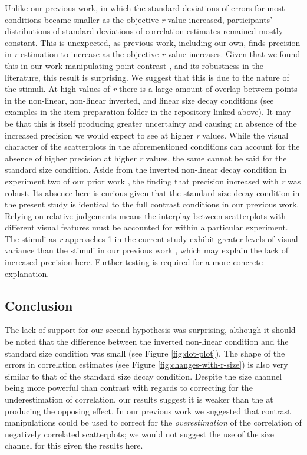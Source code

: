 \documentclass{vgtc}                          %
\begin{document}
Unlike our previous work, in which the standard deviations of errors for most
conditions became smaller as the objective \emph{r} value increased, participants'
distributions of standard deviations of correlation estimates remained mostly constant. This
is unexpected, as previous work, including our own, finds precision
in \emph{r} estimation to increase as the objective \emph{r} value increases. Given that we found
this in our work manipulating point contrast \cite{strain_2023}, and
its robustness in the literature, this result is surprising. We suggest that this
is due to the nature of the stimuli. At high values of \emph{r} there is a large amount
of overlap between points in the non-linear, non-linear inverted, and linear size decay conditions (see examples in the item preparation folder in the repository linked above). It may be that this
is itself producing greater uncertainty and causing an absence of the increased
precision we would expect to see at higher \emph{r} values. While the visual character
of the scatterplots in the aforementioned conditions can account for the absence
of higher precision at higher \emph{r} values, the same cannot be said for the standard size
condition. Aside from the inverted non-linear decay condition in experiment two of
our prior work \cite{strain_2023}, the finding that precision increased with \emph{r}
was robust. Its absence here is curious given that the standard size decay condition in
the present study is identical to the full contrast conditions in our previous work.
Relying on relative judgements means
the interplay between scatterplots with different visual features must be accounted
for within a particular experiment. The stimuli as \emph{r} approaches 1 in the current
study exhibit greater levels of visual variance than the stimuli in our previous work \cite{strain_2023},
which may explain the lack of increased precision here. Further testing is required
for a more concrete explanation.

\hypertarget{conclusion}{%
\subsection{Conclusion}\label{conclusion}}

The lack of support for our second hypothesis was surprising, although it should
be noted that the difference between the inverted non-linear condition and the standard size
condition was small (see Figure \ref{fig:dot-plot}). The shape of the errors
in correlation estimates (see Figure \ref{fig:changes-with-r-size}) is also
very similar to that of the standard size decay condition. Despite the size channel
being more powerful than contrast with regards to correcting
for the underestimation of correlation, our results suggest it is weaker than the at
producing the opposing effect. In our previous work we suggested that contrast
manipulations could be used to correct for the \emph{overestimation} of the correlation
of negatively correlated scatterplots; we would not suggest the use of the size
channel for this given the results here.
\end{document}
